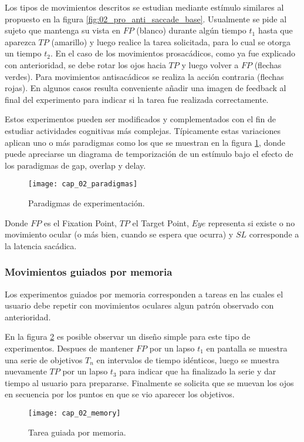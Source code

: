 \documentclass[../main.tex]{subfiles}
\begin{document}
				Los tipos de movimientos descritos se estudian mediante estímulo similares al propuesto en la figura \ref{fig:02_pro_anti_saccade_base}. Usualmente se pide al sujeto que mantenga su vista en $FP$ (blanco) durante algún tiempo $t_1$ hasta que aparezca $TP$ (amarillo) y luego realice la tarea solicitada, para lo cual se otorga un tiempo $t_2$. En el caso de los movimientos prosacádicos, como ya fue explicado con anterioridad, se debe rotar los ojos hacia $TP$ y luego volver a $FP$ (flechas verdes). Para movimientos antisacádicos se realiza la acción contraria (flechas rojas). En algunos casos resulta conveniente añadir una imagen de feedback al final del experimento para indicar si la tarea fue realizada correctamente. 

				Estos experimentos pueden ser modificados y complementados con el fin de estudiar actividades cognitivas más complejas. Típicamente estas variaciones aplican uno o más paradigmas como los que se muestran en la figura \ref{fig:02_paradigmas}, donde puede apreciarse un diagrama de temporización de un estímulo bajo el efecto de los paradigmas de gap, overlap y delay. 
				\begin{figure}[H]
					\centering
					\texttt{[image: cap\_02\_paradigmas]}
					\caption{Paradigmas de experimentación.}
					\label{fig:02_paradigmas}
				\end{figure} 

				Donde $FP$ es el Fixation Point, $TP$ el Target Point, $Eye$ representa si existe o no movimiento ocular (o más bien, cuando se espera que ocurra) y $SL$ corresponde a la latencia sacádica.  


			\subsubsection{Movimientos guiados por memoria}
			\label{ssub:movimientos_pro_anti_sacadicos}

				Los experimentos guiados por memoria corresponden a tareas en las cuales el usuario debe repetir con movimientos oculares algun patrón observado con anterioridad. 

				En la figura \ref{fig:02_memory} es posible observar un diseño simple para este tipo de experimentos. Despues de mantener $FP$ por un lapso $t_1$ en pantalla se muestra una serie de objetivos $T_n$ en intervalos de tiempo idénticos, luego se muestra nuevamente $TP$ por un lapso $t_3$ para indicar que ha finalizado la serie y dar tiempo al usuario para prepararse. Finalmente se solicita que se muevan los ojos en secuencia por los puntos en que se vio aparecer los objetivos.
				\begin{figure}[H]
					\centering
					\texttt{[image: cap\_02\_memory]}
					\caption{Tarea guiada por memoria.}
					\label{fig:02_memory}
				\end{figure} 
		 
\end{document}
